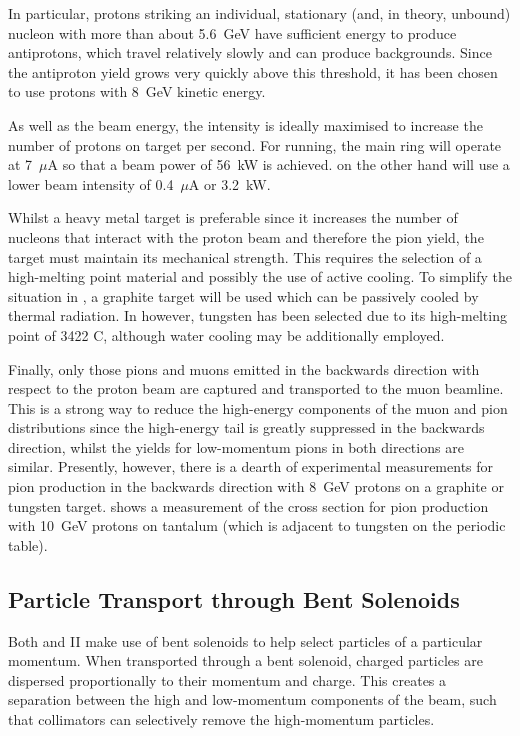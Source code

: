 In particular, protons striking an individual, stationary (and, in theory, unbound) nucleon with more than about 5.6~GeV have sufficient energy to produce antiprotons, which travel relatively slowly and can produce backgrounds.
Since the antiproton yield grows very quickly above this threshold, it has been chosen to use protons with 8~GeV kinetic energy.

As well as the beam energy, the intensity is ideally maximised to increase the number of protons on target per second.
For \phaseII running, the main ring will operate at 7~$\mu$A so that a beam power of 56~kW is achieved.  
\phaseI on the other hand will use a lower beam intensity of 0.4~$\mu$A or 3.2~kW.

Whilst a heavy metal target is preferable since it increases the number of nucleons that interact with the proton beam and therefore the pion yield,
the target must maintain its mechanical strength.
This requires the selection of a high-melting point material and possibly the use of active cooling.
To simplify the situation in \phaseI, a graphite target will be used which can be passively cooled by thermal radiation.
In \phaseII however, tungsten has been selected due to its high-melting point of 3422 C, although water cooling may be additionally employed.

\FigPionSpectraVsAngle

Finally, only those pions and muons emitted in the backwards direction with respect to the proton beam are captured and transported to the muon beamline.
This is a strong way to reduce the high-energy components of the muon and pion distributions since the high-energy tail is greatly suppressed in the backwards direction, whilst the yields for low-momentum pions in both directions are similar.
Presently, however, there is a dearth of experimental measurements for pion production in the backwards direction with 8~GeV protons on a graphite or tungsten target.
 shows a measurement of the cross section for pion production with 10~GeV protons on tantalum (which is adjacent to tungsten on the periodic table).

\subsection{Particle Transport through Bent Solenoids}
Both \phaseI and II make use of bent solenoids to help select particles of a particular momentum.
When transported through a bent solenoid, charged particles are dispersed proportionally to their momentum and charge.
This creates a separation between the high and low-momentum components of the beam, such that collimators can selectively remove the high-momentum particles.

